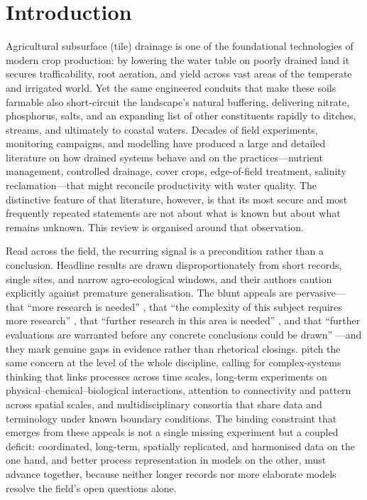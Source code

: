 \section{Introduction}

Agricultural subsurface (tile) drainage is one of the foundational
technologies of modern crop production: by lowering the water table on
poorly drained land it secures trafficability, root aeration, and yield
across vast areas of the temperate and irrigated world. Yet the same
engineered conduits that make these soils farmable also short-circuit the
landscape's natural buffering, delivering nitrate, phosphorus, salts, and
an expanding list of other constituents rapidly to ditches, streams, and
ultimately to coastal waters. Decades of field experiments, monitoring
campaigns, and modelling have produced a large and detailed literature on
how drained systems behave and on the practices---nutrient management,
controlled drainage, cover crops, edge-of-field treatment, salinity
reclamation---that might reconcile productivity with water quality. The
distinctive feature of that literature, however, is that its most secure
and most frequently repeated statements are not about what is known but
about what remains unknown. This review is organised around that
observation.

Read across the field, the recurring signal is a precondition rather than
a conclusion. Headline results are drawn disproportionately from short
records, single sites, and narrow agro-ecological windows, and their
authors caution explicitly against premature generalisation. The blunt
appeals are pervasive---that ``more research is needed''
\parencite{SHALIT1995}, that ``the complexity of this subject requires
more research'' \parencite{Malone2014}, that ``further research in this
area is needed'' \parencite{Woo2023}, and that ``further evaluations are
warranted before any concrete conclusions could be drawn''
\parencite{GUPTA1993}---and they mark genuine gaps in evidence rather than
rhetorical closings. \textcite{Rogger2017} pitch the same concern at the
level of the whole discipline, calling for complex-systems thinking that
links processes across time scales, long-term experiments on
physical--chemical--biological interactions, attention to connectivity and
pattern across spatial scales, and multidisciplinary consortia that share
data and terminology under known boundary conditions. The binding
constraint that emerges from these appeals is not a single missing
experiment but a coupled deficit: coordinated, long-term, spatially
replicated, and harmonised data on the one hand, and better process
representation in models on the other, must advance together, because
neither longer records nor more elaborate models resolve the field's open
questions alone.

